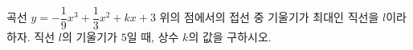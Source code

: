 곡선 $y=-\dfrac{1}{9}x^3+\dfrac{1}{3}x^2+kx+3$ 위의 점에서의 접선 중 기울기가 최대인 직선을 $l$이라 하자. 직선 $l$의 기울기가 $5$일 때, 상수 $k$의 값을 구하시오.
